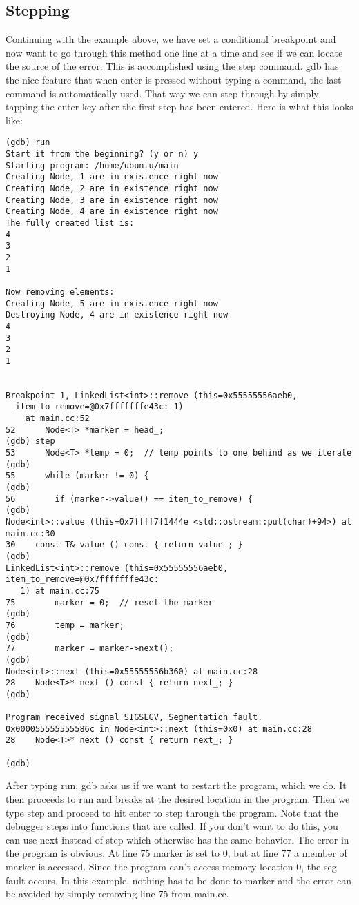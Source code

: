 \subsection{Stepping}
Continuing with the example above, we have set a conditional breakpoint and now want to go through this method one line at a time and see if we can locate the source of the error. This is accomplished using the step command. gdb has the nice feature that when enter is pressed without typing a command, the last command is automatically used. That way we can step through by simply tapping the enter key after the first step has been entered. Here is what this looks like:
\begin{verbatim}
(gdb) run
Start it from the beginning? (y or n) y
Starting program: /home/ubuntu/main 
Creating Node, 1 are in existence right now
Creating Node, 2 are in existence right now
Creating Node, 3 are in existence right now
Creating Node, 4 are in existence right now
The fully created list is:
4
3
2
1

Now removing elements:
Creating Node, 5 are in existence right now
Destroying Node, 4 are in existence right now
4
3
2
1


Breakpoint 1, LinkedList<int>::remove (this=0x55555556aeb0, 
  item_to_remove=@0x7fffffffe43c: 1)
    at main.cc:52
52	    Node<T> *marker = head_;
(gdb) step
53	    Node<T> *temp = 0;  // temp points to one behind as we iterate
(gdb) 
55	    while (marker != 0) {
(gdb) 
56	      if (marker->value() == item_to_remove) {
(gdb) 
Node<int>::value (this=0x7ffff7f1444e <std::ostream::put(char)+94>) at main.cc:30
30	  const T& value () const { return value_; }
(gdb) 
LinkedList<int>::remove (this=0x55555556aeb0, item_to_remove=@0x7fffffffe43c: 
   1) at main.cc:75
75	      marker = 0;  // reset the marker
(gdb) 
76	      temp = marker;
(gdb) 
77	      marker = marker->next();
(gdb) 
Node<int>::next (this=0x55555556b360) at main.cc:28
28	  Node<T>* next () const { return next_; }
(gdb) 

Program received signal SIGSEGV, Segmentation fault.
0x000055555555586c in Node<int>::next (this=0x0) at main.cc:28
28	  Node<T>* next () const { return next_; }

(gdb)
\end{verbatim}
After typing run, gdb asks us if we want to restart the program, which we do. It then proceeds to run and breaks at the desired location in the program. Then we type step and proceed to hit enter to step through the program. Note that the debugger steps into functions that are called. If you don't want to do this, you can use next instead of step which otherwise has the same behavior.
The error in the program is obvious. At line 75 marker is set to 0, but at line 77 a member of marker is accessed. Since the program can't access memory location 0, the seg fault occurs. In this example, nothing has to be done to marker and the error can be avoided by simply removing line 75 from main.cc.

